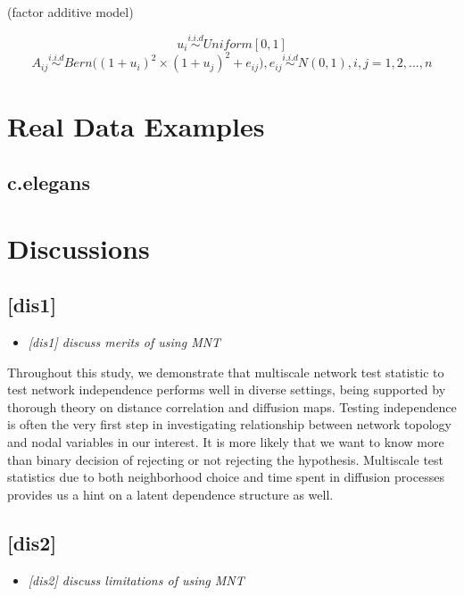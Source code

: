 \documentclass[12pt]{article}
\theoremstyle{definition}
\begin{document}
(factor additive model)


\begin{equation}
u_{i} \overset{i.i.d}{\sim} Uniform[0,1]
\end{equation}
\begin{equation}
A_{ij}  \overset{i.i.d}{\sim} Bern \big(  ( 1 + u_{i})^2 \times (1 + u_{j})^2  + e_{ij}  \big), 
e_{ij} \overset{i.i.d}{\sim} N(0,1), i,j = 1,2,...,n
\end{equation}







\newpage
\section{Real Data Examples}

\subsection{c.elegans}


\newpage
\section{Discussions}

\subsection{[dis1]}
\begin{itemize}
	\item {\it  [dis1] discuss merits of using MNT   \/}
\end{itemize}

Throughout this study, we demonstrate that multiscale network test statistic to test network independence performs well in diverse settings, being supported by thorough theory on distance correlation and diffusion maps. 
Testing independence is often the very first step in investigating relationship between network topology and nodal variables in our interest. It is more likely that we want to know more than binary decision of rejecting or not rejecting the hypothesis. Multiscale test statistics due to both neighborhood choice and time spent in diffusion processes provides us a hint on a latent dependence structure as well.  


\subsection{[dis2]}
\begin{itemize}
	\item {\it  [dis2] discuss limitations of using MNT   \/}
\end{itemize}
\end{document}
